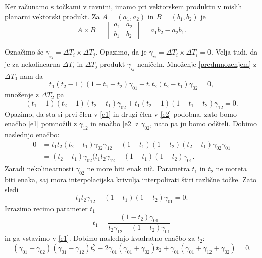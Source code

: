 \documentclass[mat1]{fmfdelo}
\newcommand{\de}{\Delta}
\begin{document}
%
\begin{opomba}
Ker računamo s točkami v ravnini, imamo pri vektorskem produktu v mislih planarni vektorski produkt. Za $A = (a_1, a_2)$ in $B = (b_1, b_2)$ je
\begin{equation*}
A \times B = 
\begin{vmatrix}
a_1 & a_2 \\
b_1 & b_2
\end{vmatrix}
= a_1 b_2 - a_2 b_1.
\end{equation*}
\end{opomba}
%
Označimo še $\gamma_{ij} = \de T_i \times \de T_j $.  Opazimo, da je $\gamma_{ii} = \de T_i \times \de T_i = 0$. Velja tudi, da je za nekolinearna $\de T_i$ in $\de T_j$ produkt $\gamma_{ij}$ neničeln. Množenje \eqref{predmnozenjem} z $\de T_0$ nam da
%
\begin{equation}\label{e1}
t_1(t_2 - 1)(1 - t_1 + t_2) \gamma_{01} +  t_1 t_2 (t_2 - t_1) \gamma_{02} = 0, 
\end{equation}
%
množenje z $\de T_2$ pa 
%
\begin{equation}\label{e2}
(t_1 - 1)(t_2 - 1)(t_2 - t_1) \gamma_{02} + t_1(t_2 - 1)(1 - t_1 + t_2) \gamma_{12} = 0.
\end{equation}
%
Opazimo, da sta si prvi člen v \eqref{e1} in drugi člen v \eqref{e2} podobna, zato bomo enačbo \eqref{e1} pomnožili z $\gamma_{12}$ in enačbo \eqref{e2} z $\gamma_{02}$, nato pa ju bomo odšteli. Dobimo naslednjo enačbo:
%
\begin{align*}
0 &= t_1 t_2 (t_2 - t_1) \gamma_{02} \gamma_{12} - (1-t_1)(1 - t_2)(t_2 - t_1)\gamma_{02}\gamma_{01} \\
&= (t_2 - t_1) \gamma_{02} (t_1 t_2 \gamma_{12} - (1- t_1)(1 - t_2)\gamma_{01} .
\end{align*}
%
Zaradi nekolinearnosti $\gamma_{02}$ ne more biti enak nič. Parametra $t_1$ in $t_2$ ne moreta biti enaka, saj mora interpolacijska krivulja interpolirati štiri različne točke. Zato sledi%
\begin{equation*}\label{zadnja}
t_1 t_2 \gamma_{12} - (1- t_1)(1 - t_2)\gamma_{01} = 0.
\end{equation*}
%
Izrazimo recimo parameter $t_1$
\begin{equation*}
t_1 = \frac{(1 - t_2) \gamma_{01}}{t_2 \gamma_{12} + (1 - t_2) \gamma_{01}}
\end{equation*}
%
in ga vstavimo v \eqref{e1}. Dobimo naslednjo kvadratno enačbo za $t_2$:
%
\begin{equation*}
(\gamma_{01} + \gamma_{02})(\gamma_{01} - \gamma_{12}) t_2^2 - 2 \gamma_{01}(\gamma_{01} + \gamma_{02}) t_2 + \gamma_{01}(\gamma_{01} + \gamma_{12} + \gamma_{02}) = 0.
\end{equation*}
\end{document}
